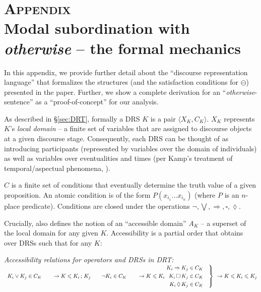 \section{\textsc{Appendix}\\Modal subordination with \textit{otherwise} -- the formal mechanics}
In this appendix, we provide further detail about the ``discourse representation language'' that formalizes the structures (and the satisfaction conditions for $ \ominus $) presented in the paper. Further, we show a complete derivation for an ``\textit{otherwise}-sentence'' as a ``proof-of-concept'' for our analysis.

As described in \S\ref{sec:DRT}, formally a DRS $ K $ is a pair $ \langle X_K,C_K\rangle $. $ X_K $ represents $ K $'s \textit{local domain} -- a finite set of variables that are assigned to discourse objects at a given discourse stage. Consequently, each DRS can be thought of as introducing participants (represented by variables over the domain of individuals) as well as variables over eventualities and times (per Kamp's \citeyearpar{Kamp1979, Kamp2017} treatment of temporal/aspectual phenomena, \citealp[see also][]{Partee}). 

$ C $ is a finite set of conditions that eventually determine the truth value of a given proposition. An atomic condition is of the form $ P(x_{i_1}...x_{i_n}) $ (where $ P $ is an $ n $-place predicate). Conditions are closed under the operations $ \neg,\bigvee,\Rightarrow,\square,\lozenge $. 

Crucially, \citet[713]{Roberts1989} also defines the notion of an ``accessible domain'' $ A_K $ -- a superset of the local domain for any given $ K $. Accessibility is a partial order that obtains over DRSs such that for any $ K $:

\pex \textit{Accessibility relations for operators and DRSs in DRT:}\\
	\hspace*{2pt}$\enspace K_i\vee K_j\in C_K\quad \hspace{0.95em}\to K\leqslant K_i\,;\,K_j\\
	\hspace*{2em}\neg K_i\in C_K\quad\qquad \hspace{-1em}\to K\leqslant K_i\\
	\left.\begin{aligned}%
	K_i\Rightarrow K_j\in C_K\quad\\
	K_i\,\square\,K_j\in C_K\quad\\
	K_i\,\lozenge\,K_j\in C_K\quad
	\end{aligned}
	\right\rbrace \hspace{0.4em}\to K\leqslant K_i\leqslant K_j $ \xe

